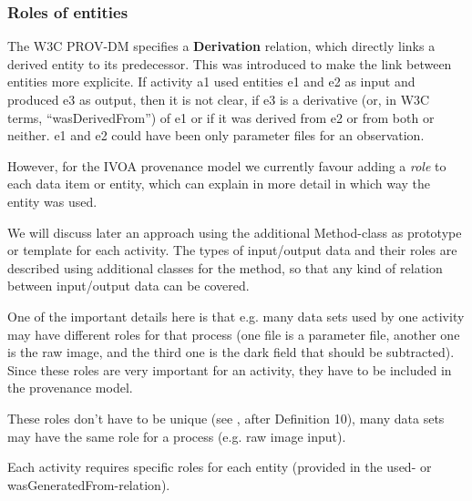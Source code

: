 \subsubsection{Roles of entities}
The W3C PROV-DM specifies a \textbf{Derivation} relation, which directly links a derived entity to its predecessor. This was introduced to make the link between entities more explicite. If activity a1 used entities e1 and e2 as input and produced e3 as output, then it is not clear, if e3 is a derivative (or, in W3C terms, ``wasDerivedFrom'') of e1 or if it was derived from e2 or from both or neither. e1 and e2 could have been only parameter files for an observation.  

However, for the IVOA provenance model we currently favour adding a \emph{role} to each data item or entity, which can explain in more detail in which way the entity was used.

We will discuss later an approach using the additional Method-class as prototype or template for each activity.
The types of input/output data and their roles are described using additional classes for the method, so that any kind of relation between input/output data can be covered.

One of the important details here is that e.g. many data sets used by one activity may have different roles for that process (one file is a parameter file, another one is the raw image, and the third one is the dark field that should be subtracted). Since these roles are very important for an activity, they have to be included in the provenance model.

These roles don't have to be unique (see \cite{moreau2010}, after Definition 10), many data sets may have the same role for a process (e.g. raw image input).

Each activity requires specific roles for each entity (provided in the used- or wasGeneratedFrom-relation). 








